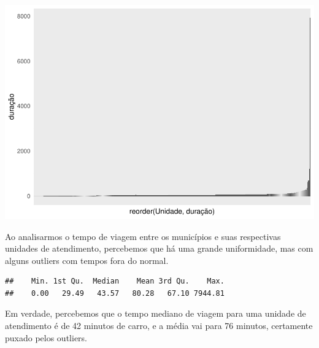 \documentclass[]{article}
\newenvironment{Shaded}{\begin{snugshade}}{\end{snugshade}}
\newcommand{\DataTypeTok}[1]{\textcolor[rgb]{0.13,0.29,0.53}{#1}}
\newcommand{\DecValTok}[1]{\textcolor[rgb]{0.00,0.00,0.81}{#1}}
\newcommand{\KeywordTok}[1]{\textcolor[rgb]{0.13,0.29,0.53}{\textbf{#1}}}
\newcommand{\NormalTok}[1]{#1}
\newcommand{\OperatorTok}[1]{\textcolor[rgb]{0.81,0.36,0.00}{\textbf{#1}}}
\newcommand{\StringTok}[1]{\textcolor[rgb]{0.31,0.60,0.02}{#1}}
\begin{document}
\includegraphics{trabalho_de_conclusao_final_files/figure-latex/unnamed-chunk-7-1.pdf}

Ao analisarmos o tempo de viagem entre os municípios e suas respectivas
unidades de atendimento, percebemos que há uma grande uniformidade, mas
com alguns outliers com tempos fora do normal.

\begin{Shaded}
\end{Shaded}

\begin{verbatim}
##    Min. 1st Qu.  Median    Mean 3rd Qu.    Max. 
##    0.00   29.49   43.57   80.28   67.10 7944.81
\end{verbatim}

Em verdade, percebemos que o tempo mediano de viagem para uma unidade de
atendimento é de 42 minutos de carro, e a média vai para 76 minutos,
certamente puxado pelos outliers.

\begin{Shaded}
\end{Shaded}
\end{document}
